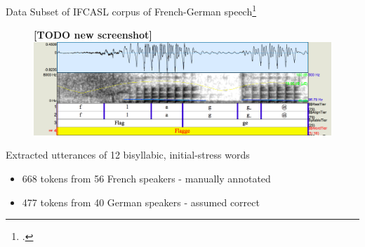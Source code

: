 \documentclass[xcolor={dvipsnames}]{beamer}
\newcommand{\TODO}[1]{{\color{red}\textbf{[TODO #1]}}}
\begin{document}
\begin{frame}{Data}
Subset of IFCASL corpus of French-German speech\footcite{Fauth2014}
		\begin{figure}
		\TODO{new screenshot}
		\includegraphics[width=\textwidth]{../../../colloquium/2SH05_FGMB1_527-flagge}
		\end{figure}

	

	Extracted utterances of 12 bisyllabic, initial-stress words
	\begin{itemize}
		\item{668 tokens from 56 French speakers - manually annotated}
		\item{477 tokens from 40 German speakers - assumed correct}
	\end{itemize}
\end{frame}
\end{document}
